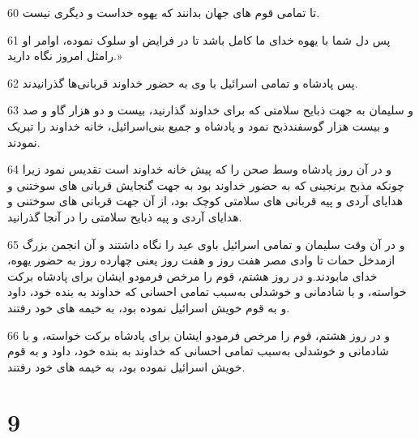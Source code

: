 \par 60 تا تمامی قوم های جهان بدانند که یهوه خداست و دیگری نیست.
\par 61 پس دل شما با یهوه خدای ما کامل باشد تا در فرایض او سلوک نموده، اوامر او رامثل امروز نگاه دارید.»
\par 62 پس پادشاه و تمامی اسرائیل با وی به حضور خداوند قربانی‌ها گذرانیدند.
\par 63 و سلیمان به جهت ذبایح سلامتی که برای خداوند گذارنید، بیست و دو هزار گاو و صد و بیست هزار گوسفندذبح نمود و پادشاه و جمیع بنی‌اسرائیل، خانه خداوند را تبریک نمودند.
\par 64 و در آن روز پادشاه وسط صحن را که پیش خانه خداوند است تقدیس نمود زیرا چونکه مذبح برنجینی که به حضور خداوند بود به جهت گنجایش قربانی های سوختنی و هدایای آردی و پیه قربانی های سلامتی کوچک بود، از آن جهت قربانی های سوختنی و هدایای آردی و پیه ذبایح سلامتی را در آنجا گذرانید.
\par 65 و در آن وقت سلیمان و تمامی اسرائیل باوی عید را نگاه داشتند و آن انجمن بزرگ ازمدخل حمات تا وادی مصر هفت روز و هفت روز یعنی چهارده روز به حضور یهوه، خدای مابودند.و در روز هشتم، قوم را مرخص فرمودو ایشان برای پادشاه برکت خواسته، و با شادمانی و خوشدلی به‌سبب تمامی احسانی که خداوند به بنده خود، داود و به قوم خویش اسرائیل نموده بود، به خیمه های خود رفتند.
\par 66 و در روز هشتم، قوم را مرخص فرمودو ایشان برای پادشاه برکت خواسته، و با شادمانی و خوشدلی به‌سبب تمامی احسانی که خداوند به بنده خود، داود و به قوم خویش اسرائیل نموده بود، به خیمه های خود رفتند.
 
\chapter{9}

